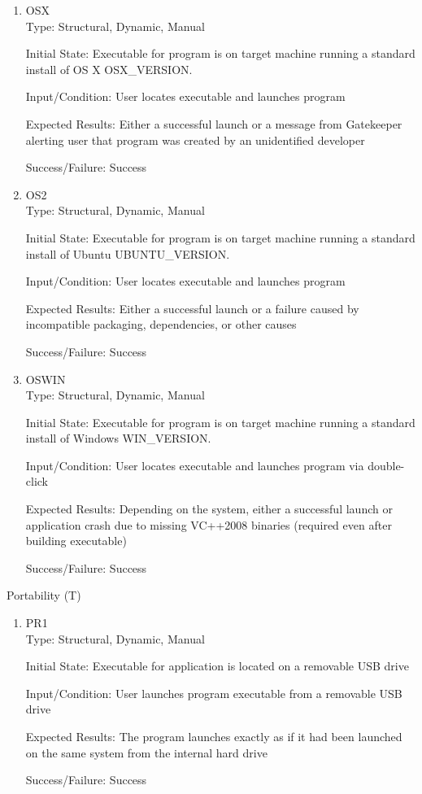 \documentclass[12pt, titlepage]{article}
\newcounter{tnum}
\newcommand{\tthetnum}{T\thetnum}
\begin{document}
	\begin{enumerate}
		\item{OSX\\}
		Type: Structural, Dynamic, Manual
		
		Initial State: Executable for program is on target machine running a
		standard install of OS X OSX\_VERSION.
		
		Input/Condition: User locates executable and launches program
		
		Expected Results: Either a successful launch or a message from Gatekeeper
		alerting user that program was created by an unidentified developer

		Success/Failure: Success
		
		\item{OS2\\}
		Type: Structural, Dynamic, Manual
		
		Initial State: Executable for program is on target machine running a
		standard install of Ubuntu UBUNTU\_VERSION.
		
		Input/Condition: User locates executable and launches program
		
		Expected Results: Either a successful launch or a failure caused by incompatible
		packaging, dependencies, or other causes

		Success/Failure: Success

		\item{OSWIN\\}
		Type: Structural, Dynamic, Manual
		
		Initial State: Executable for program is on target machine running a
		standard install of Windows WIN\_VERSION.
		
		Input/Condition: User locates executable and launches program via double-click
		
		Expected Results: Depending on the system, either a successful launch or
		application crash due to missing VC++2008 binaries (required even after 
		building executable)

		Success/Failure: Success
	\end{enumerate}

	\begin{description}
		\item[Portability (\tthetnum \label{tPort})]
	\end{description}
	\begin{enumerate}
		\item{PR1\\}
		Type: Structural, Dynamic, Manual
		
		Initial State: Executable for application is located on a removable USB drive
		
		Input/Condition: User launches program executable from a removable USB drive
		
		Expected Results: The program launches exactly as if it had been launched on
		the same system from the internal hard drive

		Success/Failure: Success
	\end{enumerate}
\end{document}
